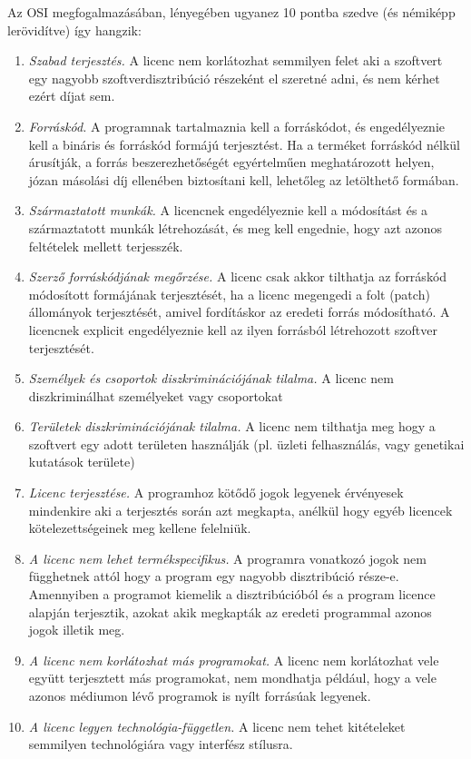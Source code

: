 \documentclass[12pt,magyar,a4paper,oneside]{scrreprt}
\begin{document}
Az OSI megfogalmazásában, lényegében ugyanez 10 pontba szedve (és
némiképp lerövidítve) így hangzik:

\begin{enumerate}
\def\labelenumi{\arabic{enumi}.}
\item
  \emph{Szabad terjesztés.} A licenc nem korlátozhat semmilyen felet aki
  a szoftvert egy nagyobb szoftverdisztribúció részeként el szeretné
  adni, és nem kérhet ezért díjat sem.
\item
  \emph{Forráskód.} A programnak tartalmaznia kell a forráskódot, és
  engedélyeznie kell a bináris és forráskód formájú terjesztést. Ha a
  terméket forráskód nélkül árusítják, a forrás beszerezhetőségét
  egyértelműen meghatározott helyen, józan másolási díj ellenében
  biztosítani kell, lehetőleg az letölthető formában.
\item
  \emph{Származtatott munkák.} A licencnek engedélyeznie kell a
  módosítást és a származtatott munkák létrehozását, és meg kell
  engednie, hogy azt azonos feltételek mellett terjesszék.
\item
  \emph{Szerző forráskódjának megőrzése.} A licenc csak akkor tilthatja
  az forráskód módosított formájának terjesztését, ha a licenc megengedi
  a folt (patch) állományok terjesztését, amivel fordításkor az eredeti
  forrás módosítható. A licencnek explicit engedélyeznie kell az ilyen
  forrásból létrehozott szoftver terjesztését.
\item
  \emph{Személyek és csoportok diszkriminációjának tilalma.} A licenc
  nem diszkriminálhat személyeket vagy csoportokat
\item
  \emph{Területek diszkriminációjának tilalma.} A licenc nem tilthatja
  meg hogy a szoftvert egy adott területen használják (pl. üzleti
  felhasználás, vagy genetikai kutatások területe)
\item
  \emph{Licenc terjesztése.} A programhoz kötődő jogok legyenek
  érvényesek mindenkire aki a terjesztés során azt megkapta, anélkül
  hogy egyéb licencek kötelezettségeinek meg kellene felelniük.
\item
  \emph{A licenc nem lehet termékspecifikus.} A programra vonatkozó
  jogok nem függhetnek attól hogy a program egy nagyobb disztribúció
  része-e. Amennyiben a programot kiemelik a disztribúcióból és a
  program licence alapján terjesztik, azokat akik megkapták az eredeti
  programmal azonos jogok illetik meg.
\item
  \emph{A licenc nem korlátozhat más programokat.} A licenc nem
  korlátozhat vele együtt terjesztett más programokat, nem mondhatja
  például, hogy a vele azonos médiumon lévő programok is nyílt forrásúak
  legyenek.
\item
  \emph{A licenc legyen technológia-független.} A licenc nem tehet
  kitételeket semmilyen technológiára vagy interfész stílusra.
\end{enumerate}
\end{document}
